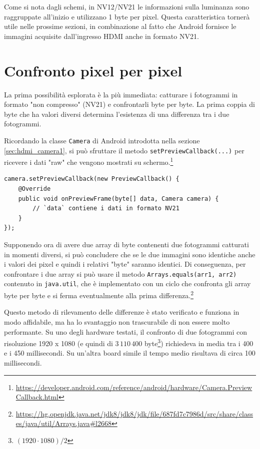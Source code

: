 \begin{figure}[H]
\end{figure}

Come si nota dagli schemi, in NV12/NV21 le informazioni sulla luminanza sono raggruppate all'inizio e utilizzano 1 byte per pixel. Questa caratteristica tornerà utile nelle prossime sezioni, in combinazione al fatto che Android fornisce le immagini acquisite dall'ingresso HDMI anche in formato NV21.

\section{Confronto pixel per pixel}
\label{sec:diff_full}

La prima possibilità esplorata è la più immediata: catturare i fotogrammi in formato "non compresso" (NV21) e confrontarli byte per byte. La prima coppia di byte che ha valori diversi determina l'esistenza di una differenza tra i due fotogrammi.

Ricordando la classe \texttt{Camera} di Android introdotta nella sezione \ref{sec:hdmi_camera1}, si può sfruttare il metodo \texttt{setPreviewCallback(...)} per ricevere i dati "raw" che vengono mostrati su schermo.\footnote{\url{https://developer.android.com/reference/android/hardware/Camera.PreviewCallback.html}}

\begin{verbatim}
camera.setPreviewCallback(new PreviewCallback() {
    @Override
    public void onPreviewFrame(byte[] data, Camera camera) {
        // `data` contiene i dati in formato NV21
    }
});
\end{verbatim}

Supponendo ora di avere due array di byte contenenti due fotogrammi catturati in momenti diversi, si può concludere che se le due immagini sono identiche anche i valori dei pixel e quindi i relativi "byte" saranno identici. Di conseguenza, per confrontare i due array si può usare il metodo \texttt{Arrays.equals(arr1, arr2)} contenuto in \texttt{java.util}, che è implementato con un ciclo che confronta gli array byte per byte e si ferma eventualmente alla prima differenza.\footnote{\url{https://hg.openjdk.java.net/jdk8/jdk8/jdk/file/687fd7c7986d/src/share/classes/java/util/Arrays.java\#l2668}}

Questo metodo di rilevamento delle differenze è stato verificato e funziona in modo affidabile, ma ha lo svantaggio non trascurabile di non essere molto performante. Su uno degli hardware testati, il confronto di due fotogrammi con risoluzione 1920 x 1080 (e quindi di $3\,110\,400$ byte\footnote{$(1920 \cdot 1080) / 2$}) richiedeva in media tra i 400 e i 450 millisecondi. Su un'altra board simile il tempo medio risultava di circa 100 millisecondi.

